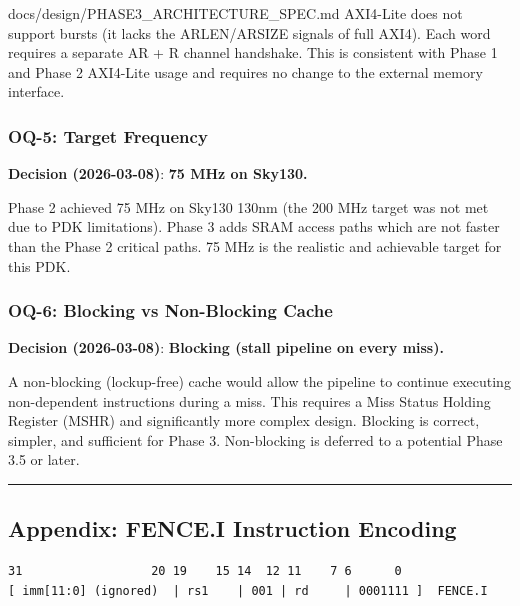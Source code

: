 \begin{relocated}{docs/design/PHASE3_ARCHITECTURE_SPEC.md}
AXI4-Lite does not support bursts (it lacks the
ARLEN/\allowbreak{}ARSIZE signals of full AXI4). Each word requires a
separate AR + R channel handshake. This is consistent with Phase 1 and
Phase 2 AXI4-Lite usage and requires no change to the external memory
interface.

\subsubsection{OQ-5: Target Frequency}\label{ds:ch:phase3-architecture:oq-5-target-frequency}

\textbf{Decision (2026-03-08)}: \ok{} \textbf{75 MHz on Sky130.}

Phase 2 achieved 75 MHz on Sky130 130nm (the 200 MHz target was not met
due to PDK limitations). Phase 3 adds SRAM access paths which are not
faster than the Phase 2 critical paths. 75 MHz is the realistic and
achievable target for this PDK.

\subsubsection{OQ-6: Blocking vs Non-Blocking Cache}\label{ds:ch:phase3-architecture:oq-6-blocking-vs-non-blocking-cache}

\textbf{Decision (2026-03-08)}: \ok{} \textbf{Blocking (stall pipeline
on every miss).}

A non-blocking (lockup-free) cache would allow the pipeline to continue
executing non-dependent instructions during a miss. This requires a Miss
Status Holding Register (MSHR) and significantly more complex design.
Blocking is correct, simpler, and sufficient for Phase 3. Non-blocking
is deferred to a potential Phase 3.5 or later.

\begin{center}\rule{0.5\linewidth}{0.5pt}\end{center}

\subsection{Appendix: FENCE.I Instruction Encoding}\label{ds:ch:phase3-architecture:13-appendix-fencei-instruction-encoding}

\begin{lstlisting}[language={}]
31                  20 19    15 14  12 11    7 6      0
[ imm[11:0] (ignored)  | rs1    | 001 | rd     | 0001111 ]  FENCE.I
\end{lstlisting}


\end{relocated}
